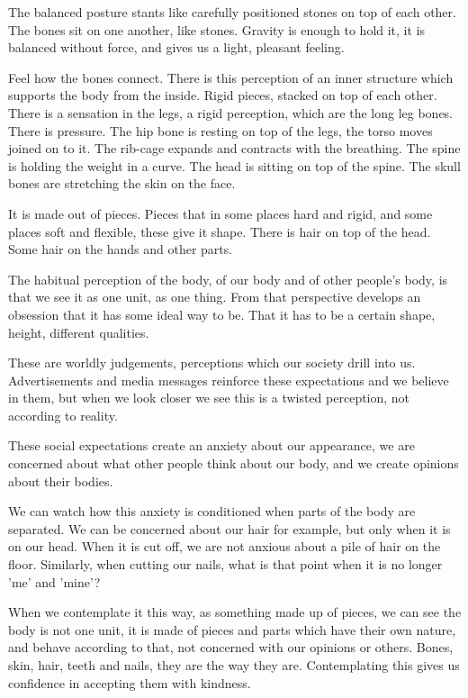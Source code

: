 The balanced posture stants like carefully positioned stones on top of
each other. The bones sit on one another, like stones. Gravity is enough
to hold it, it is balanced without force, and gives us a light, pleasant
feeling.

Feel how the bones connect. There is this perception of an inner
structure which supports the body from the inside. Rigid pieces, stacked
on top of each other. There is a sensation in the legs, a rigid
perception, which are the long leg bones. There is pressure. The hip
bone is resting on top of the legs, the torso moves joined on to it. The
rib-cage expands and contracts with the breathing. The spine is holding
the weight in a curve. The head is sitting on top of the spine. The
skull bones are stretching the skin on the face.

It is made out of pieces. Pieces that in some places hard and rigid, and
some places soft and flexible, these give it shape. There is hair on top
of the head. Some hair on the hands and other parts.

The habitual perception of the body, of our body and of other people's
body, is that we see it as one unit, as one thing. From that perspective
develops an obsession that it has some ideal way to be. That it has to
be a certain shape, height, different qualities.

These are worldly judgements, perceptions which our society drill into
us. Advertisements and media messages reinforce these expectations and
we believe in them, but when we look closer we see this is a twisted
perception, not according to reality.

These social expectations create an anxiety about our appearance, we are
concerned about what other people think about our body, and we create
opinions about their bodies.

We can watch how this anxiety is conditioned when parts of the body are
separated. We can be concerned about our hair for example, but only when
it is on our head. When it is cut off, we are not anxious about a pile
of hair on the floor. Similarly, when cutting our nails, what is that
point when it is no longer 'me' and 'mine'?

When we contemplate it this way, as something made up of pieces, we can
see the body is not one unit, it is made of pieces and parts which have
their own nature, and behave according to that, not concerned with our
opinions or others. Bones, skin, hair, teeth and nails, they are the way
they are. Contemplating this gives us confidence in accepting them with
kindness.

